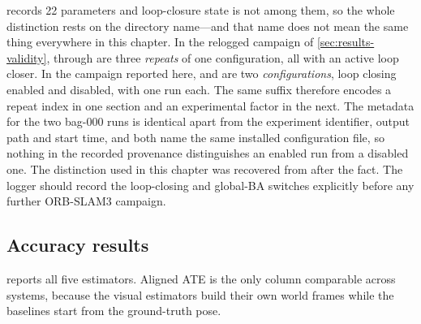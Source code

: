 \begin{queried}
 records 22 parameters and loop-closure state is not among
them, so the whole distinction rests on the directory name---and that name does
not mean the same thing everywhere in this chapter. In the relogged campaign of
\cref{sec:results-validity},  through  are
three \emph{repeats} of one configuration, all with an active loop closer. In the
 campaign reported here,  and  are two
\emph{configurations}, loop closing enabled and disabled, with one run each. The
same suffix therefore encodes a repeat index in one section and an experimental
factor in the next. The metadata for the two bag-000 runs is identical apart from the experiment
identifier, output path and start time, and both name the same installed
configuration file, so nothing in the recorded provenance distinguishes an
enabled run from a disabled one. The distinction used in this chapter was
recovered from  after the fact. The logger should record
the loop-closing and global-BA switches explicitly before any further ORB-SLAM3
campaign.
\end{queried}

\subsection{Accuracy results}

 reports all five estimators. Aligned ATE is the only
column comparable across systems, because the visual estimators build their own
world frames while the baselines start from the ground-truth pose.

